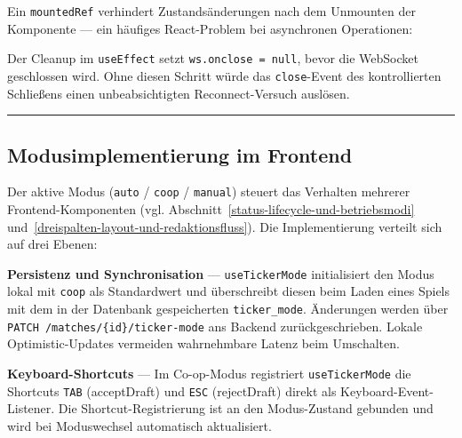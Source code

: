 Ein \texttt{mountedRef} verhindert Zustandsänderungen nach dem Unmounten
der Komponente --- ein häufiges React-Problem bei asynchronen
Operationen:

\begin{Shaded}
\begin{Highlighting}[]
 \OperatorTok{=}\NormalTok{ () }\KeywordTok{=\textgreater{}}\NormalTok{ \{}
  \NormalTok{ (}\OperatorTok{!}\NormalTok{) }\OperatorTok{;} 
\NormalTok{\}}\OperatorTok{;}
\end{Highlighting}
\end{Shaded}

Der Cleanup im \texttt{useEffect} setzt \texttt{ws.onclose\ =\ null},
bevor die WebSocket geschlossen wird. Ohne diesen Schritt würde das
\texttt{close}-Event des kontrollierten Schließens einen
unbeabsichtigten Reconnect-Versuch auslösen.

\begin{center}\rule{0.5\linewidth}{0.5pt}\end{center}

\subsection{Modusimplementierung im
Frontend}\label{modusimplementierung-im-frontend}

Der aktive Modus (\texttt{auto} / \texttt{coop} / \texttt{manual})
steuert das Verhalten mehrerer Frontend-Komponenten (vgl. Abschnitt~\ref{status-lifecycle-und-betriebsmodi} und~\ref{dreispalten-layout-und-redaktionsfluss}).
Die Implementierung verteilt sich auf drei Ebenen:

\textbf{Persistenz und Synchronisation} --- \texttt{useTickerMode}
initialisiert den Modus lokal mit \texttt{coop} als Standardwert und
überschreibt diesen beim Laden eines Spiels mit dem in der Datenbank
gespeicherten \texttt{ticker\_mode}. Änderungen werden über
\texttt{PATCH\ /matches/\{id\}/ticker-mode} ans Backend
zurückgeschrieben. Lokale Optimistic-Updates vermeiden wahrnehmbare
Latenz beim Umschalten.

\textbf{Keyboard-Shortcuts} --- Im Co-op-Modus registriert
\texttt{useTickerMode} die Shortcuts \texttt{TAB} (acceptDraft) und
\texttt{ESC} (rejectDraft) direkt als Keyboard-Event-Listener. Die
Shortcut-Registrierung ist an den Modus-Zustand gebunden und wird bei
Moduswechsel automatisch aktualisiert.

